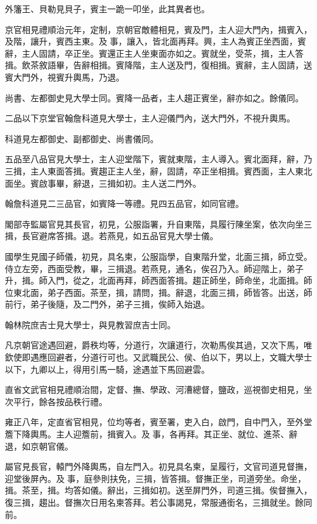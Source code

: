 \begin{pinyinscope}
外籓王、貝勒見貝子，賓主一跪一叩坐，此其異者也。

京官相見禮順治元年，定制，京朝官敵體相見，賓及門，主人迎大門內，揖賓入，及階，讓升，賓西主東。及事，讓入，皆北面再拜。興，主人為賓正坐西面，賓辭，主人固請，卒正坐。賓還正主人坐東面亦如之。賓就坐，受茶，揖，主人答揖。飲茶敘語畢，告辭相揖。賓降階，主人送及門，復相揖。賓辭，主人固請，送賓大門外，視賓升輿馬，乃退。

尚書、左都御史見大學士同。賓降一品者，主人趨正賓坐，辭亦如之。餘儀同。

二品以下京堂官翰詹科道見大學士，主人迎儀門內，送大門外，不視升輿馬。

科道見左都御史、副都御史、尚書儀同。

五品至八品官見大學士，主人迎堂階下，賓就東階，主人導入。賓北面拜，辭，乃三揖，主人東面答揖。賓趨正主人坐，辭，固請，卒正坐相揖。賓西面，主人東北面坐。賓啟事畢，辭退，三揖如初。主人送二門外。

翰詹科道見二三品官，如賓降一等禮。見四五品官，如同官禮。

閣部寺監屬官見其長官，初見，公服詣署，升自東階，具履行陳坐案，依次向坐三揖，長官避席答揖。退。若燕見，如五品官見大學士儀。

國學生見國子師儀，初見，具名柬，公服詣學，自東階升堂，北面三揖，師立受。侍立左旁，西面受教，畢，三揖退。若燕見，通名，俟召乃入。師迎階上，弟子升，揖。師入門，從之，北面再拜，師西面答揖。趨正師坐，師命坐，北面揖。師位東北面，弟子西面。茶至，揖，請問，揖。辭退，北面三揖，師皆答。出送，師前行，弟子後隨，及二門外，弟子三揖，俟師入始退。

翰林院庶吉士見大學士，與見教習庶吉士同。

凡京朝官途遇回避，爵秩均等，分道行，次讓道行，次勒馬俟其過，又次下馬，唯欽使即遇應回避者，分道行可也。又武職民公、侯、伯以下，男以上，文職大學士以下，九卿以上，得用引馬一騎，途遇並下馬回避雲。

直省文武官相見禮順治間，定督、撫、學政、河漕總督，鹽政，巡視御史相見，坐次平行，餘各按品秩行禮。

雍正八年，定直省官相見，位均等者，賓至署，吏入白，啟門，自中門入，至外堂簷下降輿馬。主人迎簷前，揖賓入。及事，各再拜。其正坐、就位、進茶、辭退，如京朝官儀。

屬官見長官，轅門外降輿馬，自左門入。初見具名柬，呈履行，文官司道見督撫，迎堂後屏內。及事，庭參則扶免，三揖，皆答揖。督撫正坐，司道旁坐。命坐，揖。茶至，揖。均答如儀。辭出，三揖如初。送至屏門外，司道三揖。俟督撫入，復三揖，趨出。督撫次日用名柬答拜。若公事謁見，常服通銜名，三揖就坐。餘同前。


\end{pinyinscope}

